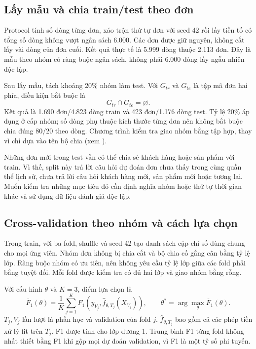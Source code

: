 \subsection{Lấy mẫu và chia train/test theo đơn}
Protocol  tính số dòng từng đơn, xáo trộn thứ tự đơn
với seed 42 rồi lấy tiền tố có tổng số dòng không vượt ngân sách 6.000.
Các đơn được giữ nguyên, không cắt lấy vài dòng của đơn cuối. Kết quả thực
tế là 5.999 dòng thuộc 2.113 đơn. Đây là mẫu theo nhóm có ràng buộc ngân
sách, không phải 6.000 dòng lấy ngẫu nhiên độc lập.

Sau lấy mẫu,  tách khoảng 20\% nhóm làm test.
Với $G_{tr}$ và $G_{te}$ là tập mã đơn hai phía, điều kiện bắt buộc là
\begin{equation}
G_{tr}\cap G_{te}=\varnothing.
\end{equation}
Kết quả là 1.690 đơn/4.823 dòng train và 423 đơn/1.176 dòng test. Tỷ lệ
20\% áp dụng ở cấp nhóm; số dòng phụ thuộc kích thước từng đơn nên không
bắt buộc chia đúng 80/20 theo dòng. Chương trình kiểm tra giao nhóm bằng
tập hợp, thay vì chỉ dựa vào tên bộ chia (xem ).

Những đơn mới trong test vẫn có thể chia sẻ khách hàng hoặc sản phẩm với
train. Vì thế, split này trả lời câu hỏi dự đoán đơn chưa thấy trong cùng
quần thể lịch sử, chưa trả lời câu hỏi khách hàng mới, sản phẩm mới hoặc
tương lai. Muốn kiểm tra những mục tiêu đó cần định nghĩa nhóm hoặc thứ tự
thời gian khác và sử dụng dữ liệu đánh giá độc lập.

\subsection{Cross-validation theo nhóm và cách lựa chọn}
Trong train,  với ba fold, shuffle và seed 42
tạo danh sách cặp chỉ số dùng chung cho mọi ứng viên. Nhóm đơn không bị
chia cắt và bộ chia cố gắng cân bằng tỷ lệ lớp. Ràng buộc nhóm có ưu tiên,
nên không yêu cầu tỷ lệ lớp giữa các fold phải bằng tuyệt đối. Mỗi fold
được kiểm tra có đủ hai lớp và giao nhóm bằng rỗng.

Với cấu hình $\theta$ và $K=3$, điểm lựa chọn là
\begin{equation}
\overline F_1(\theta)=\frac{1}{K}\sum_{j=1}^{K}
F_1\!\left(y_{V_j},\hat f_{\theta,T_j}(X_{V_j})\right),\qquad
\theta^*=\arg\max_\theta\overline F_1(\theta).
\end{equation}
$T_j,V_j$ lần lượt là phần học và validation của fold $j$.
$\hat f_{\theta,T_j}$ bao gồm cả các phép tiền xử lý fit trên $T_j$.
F1 được tính cho lớp dương 1. Trung bình F1 từng fold không nhất thiết bằng
F1 khi gộp mọi dự đoán validation, vì F1 là một tỷ số phi tuyến.

